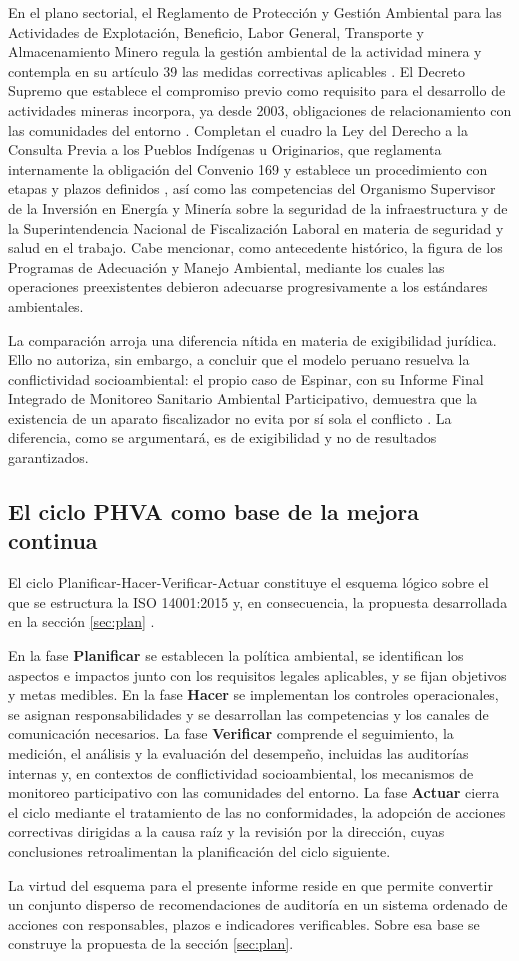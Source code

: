 En el plano sectorial, el Reglamento de Protección y Gestión Ambiental para las
Actividades de Explotación, Beneficio, Labor General, Transporte y Almacenamiento
Minero regula la gestión ambiental de la actividad minera y contempla en su
artículo 39 las medidas correctivas aplicables
\parencite{minem2014ds040}. El Decreto Supremo que establece el compromiso previo
como requisito para el desarrollo de actividades mineras incorpora, ya desde 2003,
obligaciones de relacionamiento con las comunidades del entorno
\parencite{minem2003ds042}. Completan el cuadro la Ley del Derecho a la Consulta
Previa a los Pueblos Indígenas u Originarios, que reglamenta internamente la
obligación del Convenio 169 y establece un procedimiento con etapas y plazos
definidos \parencite{congreso2011ley29785}, así como las competencias del
Organismo Supervisor de la Inversión en Energía y Minería sobre la seguridad de la
infraestructura y de la Superintendencia Nacional de Fiscalización Laboral en
materia de seguridad y salud en el trabajo. Cabe mencionar, como antecedente
histórico, la figura de los Programas de Adecuación y Manejo Ambiental, mediante
los cuales las operaciones preexistentes debieron adecuarse progresivamente a los
estándares ambientales.

La comparación arroja una diferencia nítida en materia de exigibilidad jurídica.
Ello no autoriza, sin embargo, a concluir que el modelo peruano resuelva la
conflictividad socioambiental: el propio caso de Espinar, con su Informe Final
Integrado de Monitoreo Sanitario Ambiental Participativo, demuestra que la
existencia de un aparato fiscalizador no evita por sí sola el conflicto
\parencite{minam2013espinar}. La diferencia, como se argumentará, es de
exigibilidad y no de resultados garantizados.

\subsection{El ciclo PHVA como base de la mejora continua}

El ciclo Planificar-Hacer-Verificar-Actuar constituye el esquema lógico sobre el
que se estructura la ISO 14001:2015 y, en consecuencia, la propuesta desarrollada
en la sección \ref{sec:plan} \parencite{iso2015iso14001}.

En la fase \textbf{Planificar} se establecen la política ambiental, se identifican
los aspectos e impactos junto con los requisitos legales aplicables, y se fijan
objetivos y metas medibles. En la fase \textbf{Hacer} se implementan los controles
operacionales, se asignan responsabilidades y se desarrollan las competencias y
los canales de comunicación necesarios. La fase \textbf{Verificar} comprende el
seguimiento, la medición, el análisis y la evaluación del desempeño, incluidas las
auditorías internas y, en contextos de conflictividad socioambiental, los
mecanismos de monitoreo participativo con las comunidades del entorno. La fase
\textbf{Actuar} cierra el ciclo mediante el tratamiento de las no conformidades,
la adopción de acciones correctivas dirigidas a la causa raíz y la revisión por la
dirección, cuyas conclusiones retroalimentan la planificación del ciclo siguiente.

La virtud del esquema para el presente informe reside en que permite convertir un
conjunto disperso de recomendaciones de auditoría en un sistema ordenado de
acciones con responsables, plazos e indicadores verificables. Sobre esa base se
construye la propuesta de la sección \ref{sec:plan}.
